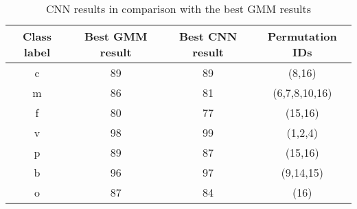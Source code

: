 \begin{table}[tb]
\caption[CNN results in comparison with the best GMM results]{CNN results in comparison with the best GMM results}
\label{tab:cnn_result_db3}
\centering
\begin{tabular}{cccc}
\toprule
Class label & Best GMM result & Best CNN result & Permutation IDs  \\
\midrule
c & 89 & 89 & (8,16)\\
m & 86 & 81 & (6,7,8,10,16)\\
f & 80 & 77 & (15,16)\\
v & 98 & 99 & (1,2,4)\\
p & 89 & 87 & (15,16)\\
b & 96 & 97 & (9,14,15)\\
o & 87 & 84 & (16)\\
\bottomrule 
\end{tabular}
\end{table}